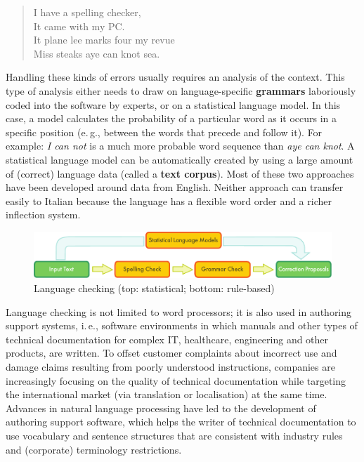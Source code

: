 \begin{multicols}{2}
\begin{quote}
  I have a spelling checker,\\
  It came with my PC.\\
  It plane lee marks four my revue\\
  Miss steaks aye can knot sea.
\end{quote}
 
Handling these kinds of errors usually requires an analysis of the context.
This type of analysis either needs to draw on language-specific
\textbf{grammars} laboriously coded into the software by experts, or on a
statistical language model. In this case, a model calculates the probability
of a particular word as it occurs in a specific position (e.\,g., between the
words that precede and follow it). For example: \emph{I can not} is a much more probable word sequence than \emph{aye can knot}. A statistical language model can be automatically created by using a large amount of (correct) language data (called a \textbf{text corpus}). Most of these two approaches have been developed around data from English. Neither approach can transfer easily to Italian because the language has a flexible word order and a richer inflection system. 

\begin{figure}[htb]
  \center
  \includegraphics[width=\textwidth]{../_media/english/language_checking}
  \caption{Language checking (top: statistical; bottom: rule-based)}
  \label{fig:langcheckingaarch_en}
\end{figure}


Language checking is not limited to word processors; it is also used in authoring support systems, i.\,e., software environments in which manuals and other types of technical documentation for complex IT, healthcare, engineering and other products, are written. To offset customer complaints about incorrect use and damage claims resulting from poorly understood instructions, companies are increasingly focusing on the quality of technical documentation while targeting the international market (via translation or localisation) at the same time. Advances in natural language processing have led to the development of authoring support software, which helps the writer of technical documentation to use vocabulary and sentence structures that are consistent with industry rules and (corporate) terminology restrictions.


\end{multicols}
